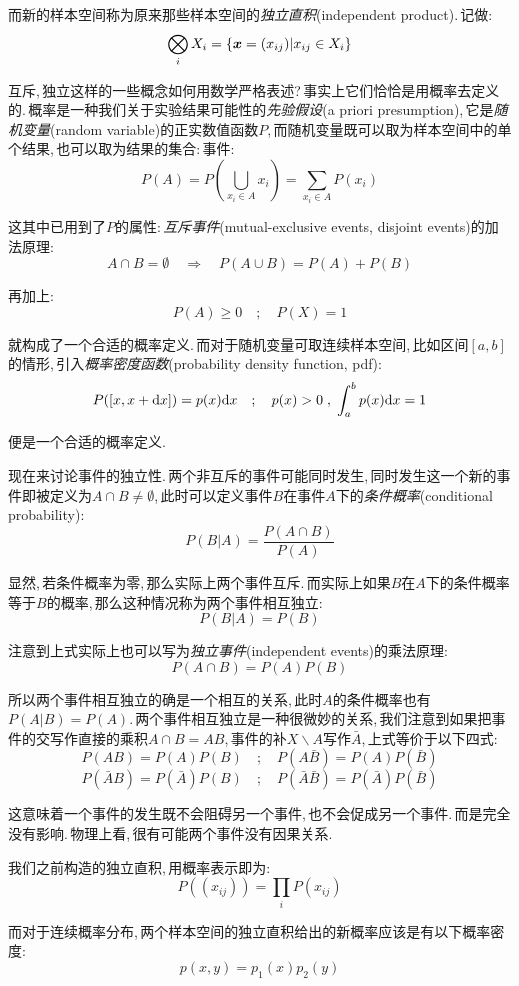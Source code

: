 而新的样本空间称为原来那些样本空间的\emph{独立直积}(independent product).\,记做:
\[\bigotimes_i X_i=\{\boldsymbol{x}=(x_{ij})|x_{ij}\in X_i\}\]

互斥,\,独立这样的一些概念如何用数学严格表述?\,事实上它们恰恰是用概率去定义的.\,概率是一种我们关于实验结果可能性的\emph{先验假设}(a priori presumption),\,它是\emph{随机变量}(random variable)的正实数值函数\(P\),\,而随机变量既可以取为样本空间中的单个结果,\,也可以取为结果的集合:\,事件:
\[P(A)=P(\bigcup_{x_i\in A} {x_i})=\sum_{x_i\in A} P(x_i)\]

这其中已用到了\(P\)的属性:\,\emph{互斥事件}(mutual-exclusive events, disjoint events)的加法原理:
\[A\cap B=\emptyset\quad \Rightarrow\quad P(A\cup B)=P(A)+P(B)\]

再加上:
\[P(A)\geqslant 0\quad ;\quad P(X)=1\]

就构成了一个合适的概率定义.\,而对于随机变量可取连续样本空间,\,比如区间\([a,b]\)的情形,\,引入\emph{概率密度函数}(probability density function, pdf):
\[P([x,x+\textrm{d} x])=p(x)\textrm{d} x\quad ;\quad p(x)>0\;,\;\int_a^b p(x)\textrm{d} x=1\]

便是一个合适的概率定义.

现在来讨论事件的独立性.\,两个非互斥的事件可能同时发生,\,同时发生这一个新的事件即被定义为\(A\cap B\neq \emptyset\),\,此时可以定义事件\(B\)在事件\(A\)下的\emph{条件概率}(conditional probability):
\[P(B|A)=\frac{P(A\cap B)}{P(A)}\]

显然,\,若条件概率为零,\,那么实际上两个事件互斥.\,而实际上如果\(B\)在\(A\)下的条件概率等于\(B\)的概率,\,那么这种情况称为两个事件相互独立:
\[P(B|A)=P(B)\]

注意到上式实际上也可以写为\emph{独立事件}(independent events)的乘法原理:
\[P(A\cap B)=P(A)P(B)\]

所以两个事件相互独立的确是一个相互的关系,\,此时\(A\)的条件概率也有\(P(A|B)=P(A)\).\,两个事件相互独立是一种很微妙的关系,\,我们注意到如果把事件的交写作直接的乘积$A\cap B=AB$,\,事件的补$X\backslash A$写作$\bar{A}$,\,上式等价于以下四式:
\[P(AB)=P(A)P(B)\quad ;\quad P(A\bar{B})=P(A)P(\bar{B})\]
\[P(\bar{A}B)=P(\bar{A})P(B)\quad ;\quad P(\bar{A}\bar{B})=P(\bar{A})P(\bar{B})\]

这意味着一个事件的发生既不会阻碍另一个事件,\,也不会促成另一个事件.\,而是完全没有影响.\,物理上看,\,很有可能两个事件没有因果关系.

我们之前构造的独立直积,\,用概率表示即为:
\[P((x_{ij}))=\prod_i P(x_{ij})\]

而对于连续概率分布,\,两个样本空间的独立直积给出的新概率应该是有以下概率密度:
\[p(x,y)=p_1(x)p_2(y)\]


